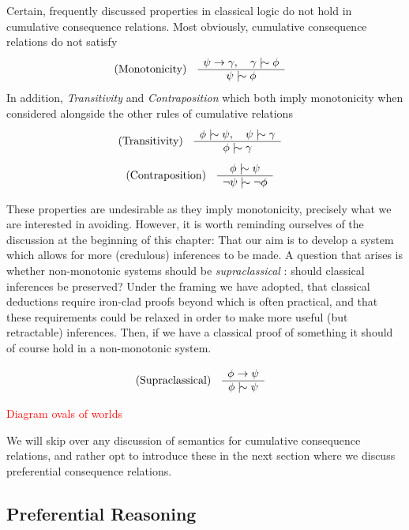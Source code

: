 Certain, frequently discussed properties in classical logic do not hold in cumulative consequence relations. Most obviously, cumulative consequence
relations do not satisfy
\begin{align}
  \label{postulate:monotonicity}\inferLeft{Monotonicity}{\psi \rightarrow \gamma, \quad \gamma \twiddle \phi}{\psi \twiddle \phi}
\end{align}
In addition, \textit{Transitivity} and \textit{Contraposition} which both imply monotonicity when considered alongside the other rules of
cumulative relations
\begin{align}
  \label{postulate:trans}\inferLeft{Transitivity}{\phi \twiddle \psi, \quad \psi \twiddle \gamma}{\phi \twiddle \gamma}
\end{align}
%
\begin{align}
  \label{postulate:contra}\inferLeft{Contraposition}{\phi \twiddle \psi}{\neg \psi \twiddle \neg \phi}
\end{align}

These properties are undesirable as they imply monotonicity, precisely what we are interested in avoiding. However, it is worth reminding
ourselves of the discussion at the beginning of this chapter: That our aim is to develop a system which allows for more (credulous) inferences
to be made. A question that arises is whether non-monotonic systems should be \textit{supraclassical} \cite{makinson2003bridges}: should
classical inferences be preserved? Under the framing we have adopted, that classical deductions require iron-clad proofs beyond which is
often practical, and that these requirements could be relaxed in order to make more useful (but retractable) inferences. Then, if we have a classical
proof of something it should of course hold in a non-monotonic system.

\begin{align}
  \label{postulate:supraclassical}\inferLeft{Supraclassical}{\phi \rightarrow \psi}{\phi \twiddle \psi}
\end{align}

\textcolor{red}{Diagram ovals of worlds}

We will skip over any discussion of semantics for cumulative consequence relations, and rather opt to introduce these in the next section where
we discuss preferential consequence relations.

\subsection{Preferential Reasoning}
\label{subsection:system-P}

